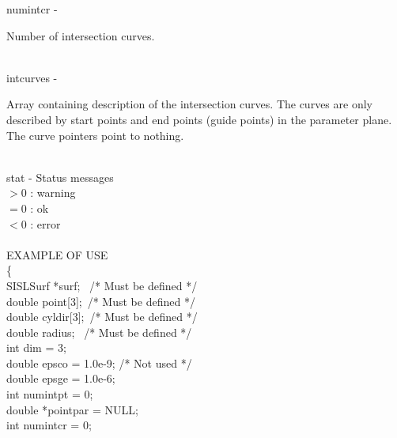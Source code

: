         \>\>    {\fov numintcr}\> - \>  \begin{minipg2}
                                Number of intersection curves.
                                \end{minipg2}\\
        \>\>    {\fov intcurves}\> - \> \begin{minipg2}
                                Array containing description of the intersection
                                curves. The curves are only described by
                                start points and end points (guide points) in
                                the parameter plane. The curve pointers point to
                                nothing.

                                \end{minipg2}\\[0.3ex]
\newpagetabs
        \>\>    {\fov stat}     \> - \> Status messages\\
                \>\>\>\>\>              $> 0$   : warning\\
                \>\>\>\>\>              $= 0$   : ok\\
                \>\>\>\>\>              $< 0$   : error\\
\\
EXAMPLE OF USE\\
                \>      \{ \\
                \>\>    SISLSurf        \>      *{\fov surf}; \, /* Must be defined */\\
                \>\>    double  \>      {\fov point}[3]; \,/* Must be defined */\\
                \>\>    double  \>      {\fov cyldir}[3]; \,/* Must be defined */\\
                \>\>    double  \>      {\fov radius}; \, /* Must be defined */\\
                \>\>    int     \>      {\fov dim} = 3;\\
                \>\>    double  \>      {\fov epsco} = 1.0e-9; /* Not used */\\
                \>\>    double  \>      {\fov epsge} = 1.0e-6;\\
                \>\>    int     \>      {\fov numintpt} = 0;\\
                \>\>    double  \>      *{\fov pointpar} = NULL;\\
                \>\>    int     \>      {\fov numintcr} = 0;\\
